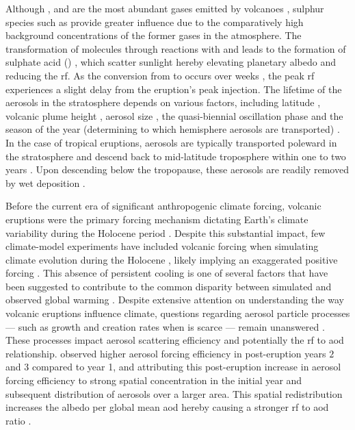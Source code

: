 \documentclass{ametsocV6.1}
\begin{document}
Although ,  and  are the most abundant gases emitted by volcanoes
\citep{robock2000}, sulphur species such as  provide greater influence due to
the comparatively high background concentrations of the former gases in the atmosphere.
The transformation of  molecules through reactions with  and 
leads to the formation of sulphate acid () \citep{robock2000}, which scatter
sunlight hereby elevating planetary albedo and reducing the \gls{rf}. As the conversion
from  to  occurs over weeks \citep{robock2000}, the peak \gls{rf}
experiences a slight delay from the eruption's peak  injection. The lifetime of
the  aerosols in the stratosphere depends on various factors, including
latitude \citep{marshall2019, toohey2019}, volcanic plume height \citep{marshall2019},
aerosol size \citep{marshall2019}, the quasi-biennial oscillation phase
\citep{pitari2016b} and the season of the year (determining to which hemisphere aerosols
are transported) \citep{toohey2011,toohey2019}. In the case of tropical eruptions,
aerosols are typically transported poleward in the stratosphere and descend back to
mid-latitude troposphere within one to two years \citep{robock2000}. Upon descending
below the tropopause, these aerosols are readily removed by wet deposition
\citep{liu2012}.

Before the current era of significant anthropogenic climate forcing, volcanic eruptions
were the primary forcing mechanism dictating Earth's climate variability during the
Holocene period \citep{sigl2022}. Despite this substantial impact, few climate-model
experiments have included volcanic forcing when simulating climate evolution during the
Holocene \citep{sigl2022}, likely implying an exaggerated positive forcing
\citep{gregory2016,solomon2011}. This absence of persistent cooling is one of several
factors that have been suggested to contribute to the common disparity between simulated
and observed global warming \citep{andersson2015}. Despite extensive attention on
understanding the way volcanic eruptions influence climate, questions regarding aerosol
particle processes --- such as growth and creation rates when  is scarce ---
remain unanswered \citep[e.g.,][]{robock2000,zanchettin2019,marshall2020,marshall2022}.
These processes impact aerosol scattering efficiency and potentially the \gls{rf} to
\gls{aod} relationship. \citet{marshall2020} observed higher aerosol forcing efficiency
in post-eruption years \(2\) and \(3\) compared to year 1, and attributing this
post-eruption increase in aerosol forcing efficiency to strong spatial concentration in
the initial year and subsequent distribution of aerosols over a larger area. This
spatial redistribution increases the albedo per global mean \gls{aod} hereby causing a
stronger \gls{rf} to \gls{aod} ratio \citep{marshall2020}.
\end{document}
